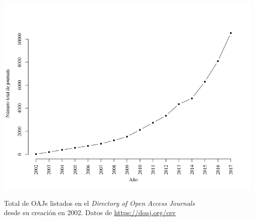 \documentclass[a0,portrait]{a0poster}
\begin{document}
\begin{multicols}{2}

  \flushleft
  \includegraphics[width=0.8\columnwidth]{../doaj_years.png}

  {\small Total de OAJs listados en el \textit{Directory of Open Access Journals} \\ desde su creación en 2002. Datos de \url{https://doaj.org/csv}}

\end{multicols}
\end{document}
